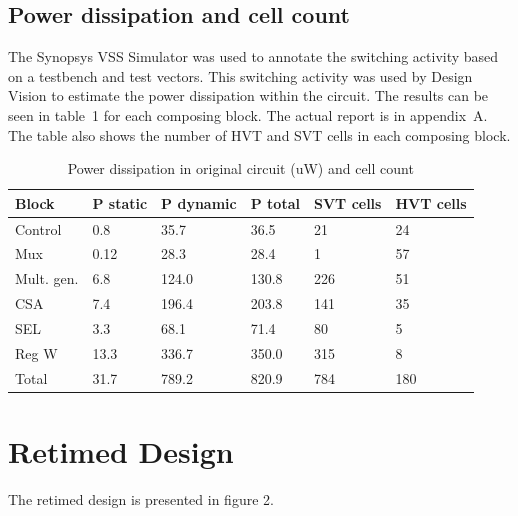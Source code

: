 \documentclass[11pt,a4paper]{article}
\begin{document}
\FloatBarrier
\subsection{Power dissipation and cell count}

The Synopsys VSS Simulator was used to annotate the switching activity based on a testbench and test vectors. This switching activity was used by Design Vision to estimate the power dissipation within the circuit. The results can be seen in table~1 for each composing block. The actual report is in appendix~A. The table also shows the number of HVT and SVT cells in each composing block.

\begin{table}[h]
\caption{Power dissipation in original circuit (uW) and cell count}
\begin{center}
\begin{tabular}{|l|l|l|l|l|l|}
\hline
\textbf{Block}	& \textbf{P static}		& \textbf{P dynamic}	& \textbf{P total} & \textbf{SVT cells} & \textbf{HVT cells}\\ \hline
Control & 0.8 & 35.7 & 36.5 & 21 & 24 \\ \hline
Mux & 0.12 & 28.3 & 28.4 & 1 & 57 	\\ \hline
Mult. gen. & 6.8 & 124.0 & 130.8 & 226 & 51 	\\ \hline
CSA & 7.4 & 196.4 & 203.8 & 141 & 35 	\\ \hline
SEL & 3.3 & 68.1 & 71.4 & 80 & 5 	\\ \hline
Reg W & 13.3 & 336.7 & 350.0 & 315 & 8 	\\ \hline \hline
Total & 31.7 & 789.2 & 820.9 & 784 & 180 \\ \hline
\end{tabular}
\end{center}
\label{table:powerOriginal}
\end{table}
\FloatBarrier
\section{Retimed Design}

The retimed design is presented in figure 2.
\end{document}
